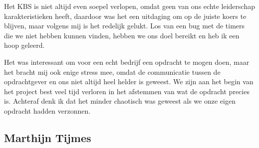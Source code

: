 Het KBS is niet altijd even soepel verlopen, omdat geen van ons echte leiderschap
karakteristieken heeft, daardoor was het een uitdaging om op de juiste koers te
blijven, maar volgens mij is het redelijk gelukt. Los van een bug met de timers
die we niet hebben kunnen vinden, hebben we ons doel bereikt en heb ik een hoop
geleerd.

Het was interessant om voor een echt bedrijf een opdracht te mogen doen, maar het
bracht mij ook enige stress mee, omdat de communicatie tussen de opdrachtgever en
ons niet altijd heel helder is geweest. We zijn aan het begin van het project best
veel tijd verloren in het afstemmen van wat de opdracht precies is. Achteraf denk
ik dat het minder chaotisch was geweest als we onze eigen opdracht hadden verzonnen.

\subsection{Marthijn Tijmes}
